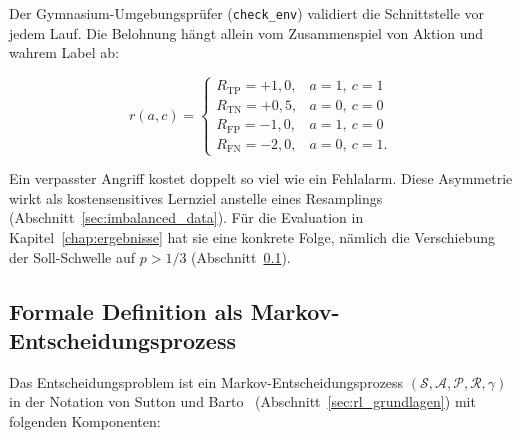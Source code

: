 Der Gymnasium-Umgebungsprüfer (\texttt{check\_env}) validiert die Schnittstelle vor jedem Lauf. Die Belohnung hängt allein vom Zusammenspiel von Aktion und wahrem Label ab:

\begin{equation}
	r(a,c)=
	\begin{cases}
		R_{\mathrm{TP}}=+1{,}0, & a=1,\ c=1 \\
		R_{\mathrm{TN}}=+0{,}5, & a=0,\ c=0 \\
		R_{\mathrm{FP}}=-1{,}0, & a=1,\ c=0 \\
		R_{\mathrm{FN}}=-2{,}0, & a=0,\ c=1 .
	\end{cases}
\end{equation}

Ein verpasster Angriff kostet doppelt so viel wie ein Fehlalarm. Diese Asymmetrie wirkt als kostensensitives Lernziel anstelle eines Resamplings (Abschnitt~\ref{sec:imbalanced_data}). Für die Evaluation in Kapitel~\ref{chap:ergebnisse} hat sie eine konkrete Folge, nämlich die Verschiebung der Soll-Schwelle auf $p>1/3$ (Abschnitt~\ref{sec:mdp_definition}).

\subsection{Formale Definition als Markov-Entscheidungsprozess}
\label{sec:mdp_definition}

Das Entscheidungsproblem ist ein Markov-Entscheidungsprozess $(\mathcal{S},\mathcal{A},\mathcal{P},\mathcal{R},\gamma)$ in der Notation von Sutton und Barto~\autocite{suttonReinforcementLearningIntroduction2018} (Abschnitt~\ref{sec:rl_grundlagen}) mit folgenden Komponenten:

